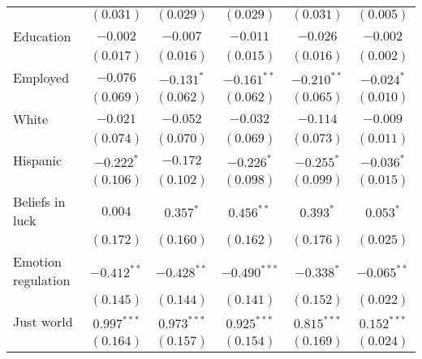 \begin{table}[!t]
\begin{center}
{\begin{threeparttable}
\begin{tabular}{l c c c c c}
                                                & $(0.031)$      & $(0.029)$      & $(0.029)$      & $(0.031)$      & $(0.005)$      \\
Education                                       & $-0.002$       & $-0.007$       & $-0.011$       & $-0.026$       & $-0.002$       \\
                                                & $(0.017)$      & $(0.016)$      & $(0.015)$      & $(0.016)$      & $(0.002)$      \\
Employed                                        & $-0.076$       & $-0.131^{*}$   & $-0.161^{**}$  & $-0.210^{**}$  & $-0.024^{*}$   \\
                                                & $(0.069)$      & $(0.062)$      & $(0.062)$      & $(0.065)$      & $(0.010)$      \\
White                                           & $-0.021$       & $-0.052$       & $-0.032$       & $-0.114$       & $-0.009$       \\
                                                & $(0.074)$      & $(0.070)$      & $(0.069)$      & $(0.073)$      & $(0.011)$      \\
Hispanic                                        & $-0.222^{*}$   & $-0.172$       & $-0.226^{*}$   & $-0.255^{*}$   & $-0.036^{*}$   \\
                                                & $(0.106)$      & $(0.102)$      & $(0.098)$      & $(0.099)$      & $(0.015)$      \\
Beliefs in luck                                 & $0.004$        & $0.357^{*}$    & $0.456^{**}$   & $0.393^{*}$    & $0.053^{*}$    \\
                                                & $(0.172)$      & $(0.160)$      & $(0.162)$      & $(0.176)$      & $(0.025)$      \\
Emotion regulation                              & $-0.412^{**}$  & $-0.428^{**}$  & $-0.490^{***}$ & $-0.338^{*}$   & $-0.065^{**}$  \\
                                                & $(0.145)$      & $(0.144)$      & $(0.141)$      & $(0.152)$      & $(0.022)$      \\
Just world                                      & $0.997^{***}$  & $0.973^{***}$  & $0.925^{***}$  & $0.815^{***}$  & $0.152^{***}$  \\
                                                & $(0.164)$      & $(0.157)$      & $(0.154)$      & $(0.169)$      & $(0.024)$      \\

\end{tabular}
\end{threeparttable}}
\end{center}
\end{table}

